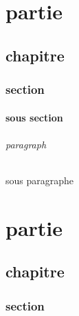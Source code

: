 \documentclass{report}
\begin{document}

\part{partie}
\chapter{chapitre}
\section{section}
\subsection{sous section}
\paragraph{paragraph}
\subparagraph{sous paragraphe}

\part{partie}
\chapter{chapitre}
\section{section}
\end{document}
